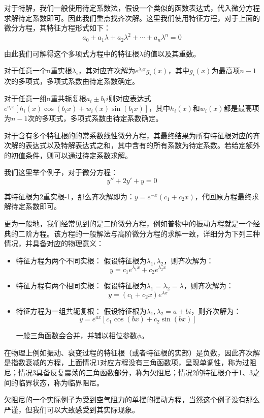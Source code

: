 对于特解，我们一般使用待定系数法，假设一个类似的函数表达式，代入微分方程求解待定系数即可。因此我们重点找齐次解。这里我们使用特征方程，对于上面的微分方程，其特征方程形式如下：
\[a_0 + a_1\lambda + a_2\lambda^2 + \cdots + a_n\lambda^n = 0\]

由此我们可解得这个多项式方程中的特征根$\lambda$的值以及其重数。
\begin{Itemize}
    \item 对于任意一个n重实根$\lambda_i$，其对应齐次解为$e^{\lambda_i x}g_i(x)$，其中$g_i(x)$为最高项$n-1$次的多项式，多项式系数由待定系数确定。
    \item 对于任意一组n重共轭复根$a_i\pm b_i i$则对应表达式$e^{a_i x}[h_i(x)\cos(b_i x)+w_i(x)\sin(b_i x)]$，其中$h_i(x)$和$w_i(x)$都是最高项为$n-1$次的多项式，多项式系数由待定系数确定。
\end{Itemize}

对于含有多个特征根的的常系数线性微分方程，其最终结果为所有特征根对应的齐次解的表达式以及特解表达式之和，其中含有的所有系数为待定系数。若给定额外的初值条件，则可以通过待定系数求解。

我们这里举个例子，对于微分方程：
\[y''+2y'+y=0\]

其特征根为2重实根-1，那么齐次解即为：$y=e^{-x}(c_1+c_2x)$，代回原方程最终求解待定系数即可。

更为一般地，我们经常见到的是二阶微分方程，例如普物中的振动方程就是一个经典的二阶方程。该方程的一般解法与高阶微分方程的求解一致，详细分为下列三种情况，并具备对应的物理意义：
\begin{itemize}
    \item 特征方程为两个不同实根：
    假设特征根为$\lambda_1,\lambda_2$，则齐次解为：
    \[y=c_1e^{\lambda_1x}+c_2e^{\lambda_2x}\]
    \item 特征方程有两个相同实根：
    假设特征根为$\lambda_1=\lambda_2=\lambda$，则齐次解为：
    \[y=(c_1+c_2x)e^{\lambda x}\]
    \item 特征方程为一组共轭复根：
    假设特征根为$\lambda_1,\lambda_2=a\pm bi$，则齐次解为：
    \[y=e^{ax}[c_1\cos(bx)+c_2\sin(bx)]\]

    一般三角函数会合并，并辅以相位参数$\phi$。
\end{itemize}

在物理上例如振动、衰变过程的特征根（或者特征根的实部）是负数，因此齐次解是指数衰减的方程，上面情况1对应方程没有三角函数项，呈现单调性，称为过阻尼；情况3具备反复震荡的三角函数部分，称为欠阻尼；情况2的特征根介于1、3之间的临界状态，称为临界阻尼。

欠阻尼的一个实际例子为受到空气阻力的单摆的摆动方程，当然这个例子没有那么严谨，但我们可以大致感受到其实际现象。
